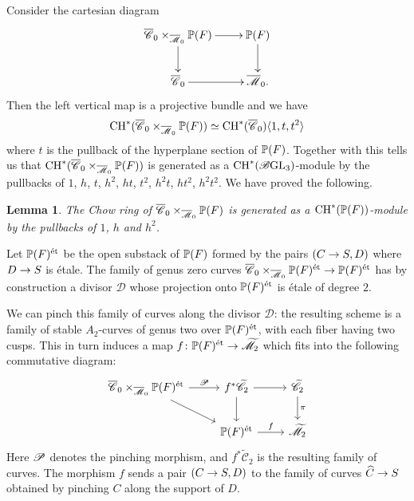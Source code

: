 \documentclass[a4paper, 10pt]{amsart}
\numberwithin{equation}{section}
\numberwithin{subsection}{section}
\newtheorem{lemma}[theorem]{Lemma}
\theoremstyle{definition}
\theoremstyle{remark}
\renewcommand{\mathcal}{\mathscr}
\newcommand\cC{\mathcal{C}} \newcommand\cD{\mathcal{D}}
\newcommand\cM{\mathcal{M}} \newcommand\cN{\mathcal{N}}
\newcommand\arr{\ifinner\to\else\longrightarrow\fi}
\newcommand{\GL}{\mathrm{GL}}
\newcommand{\Mbar}{\overline{\cM}}
\newcommand{\Mtilde}{\widetilde{\mathcal M}}
\newcommand{\Cbar}{\overline{\cC}}
\newcommand{\Ctilde}{\widetilde{\mathcal C}}
\newcommand{\ch}[1][*]{\operatorname{CH}^{#1}}
\begin{document}
	Consider the cartesian diagram 
	\[ \xymatrix{
		\Cbar_0 \times_{\Mbar_0} \PP(F) \ar[r] \ar[d] & \PP(F) \ar[d] \\
		\Cbar_0 \ar[r] & \Mbar_0.
	} \]
	Then the left vertical map is a projective bundle and we have
	\[ \ch(\Cbar_0 \times_{\Mbar_0} \PP(F)) \simeq \ch(\Cbar_0)\langle 1,t,t^2 \rangle \]
	where $t$ is the pullback of the hyperplane section of $\mathbb{P}(F)$. Together with  this tells us that $\ch(\Cbar_0 \times_{\Mbar_0} \PP(F))$ is generated as a $\ch(\cB\GL_3)$-module by the pullbacks of $1$, $h$, $t$, $h^2$, $ht$, $t^2$, $h^2t$, $ht^2$, $h^2t^2$.
	We have proved the following.
	\begin{lemma}\label{lm:chow Cbar0 times P(F)}
		The Chow ring of $\Cbar_0 \times_{\Mbar_0} \PP(F)$ is generated as a $\ch(\PP(F))$-module by the pullbacks of $1$, $h$ and $h^2$.
	\end{lemma}
	
	Let $\mathbb{P}(F)^{\rm \acute{e}t}$ be the open substack of $\mathbb{P}(F)$ formed by the pairs $(C\arr S, D)$ where $D\arr S$ is \'{e}tale.
	The family of genus zero curves $\Cbar_0 \times_{\Mbar_0} \PP(F)^{\rm \acute{e}t} \arr \PP(F)^{\rm \acute{e}t}$ has by construction a divisor $\cD$ whose projection onto $\mathbb{P}(F)^{\rm \acute{e}t}$ is \'{e}tale of degree $2$.
	
	We can pinch this family of curves along the divisor $\cD$: the resulting scheme is a family of stable $A_2$-curves of genus two over $\mathbb{P}(F)^{\rm \acute{e}t}$, with each fiber having two cusps. This in turn induces a map $f\colon\PP(F)^{\rm \acute{e}t}\arr\Mtilde_2$ which fits into the following commutative diagram:
	\begin{equation}\label{eq:diag envelope Z2}
		\begin{tikzcd}
			\Cbar_0 \times_{\Mbar_0} \PP(F)^{\rm \acute{e}t} \ar[rd] \ar[r, "\cP"] & f^*\Ctilde_2 \ar[r] \ar[d] & \Ctilde_2 \ar[d, "\pi"] \\
			& \PP(F)^{\rm \acute{e}t} \ar[r, "f"] & \Mtilde_2
		\end{tikzcd}
	\end{equation}
	Here $\cP$ denotes the pinching morphism, and $f^*\Ctilde_2$ is the resulting family of curves. The morphism $f$ sends a pair $(C\arr S, D)$ to the family of curves $\widehat{C}\arr S$ obtained by pinching $C$ along the support of $D$.
	
\end{document}
